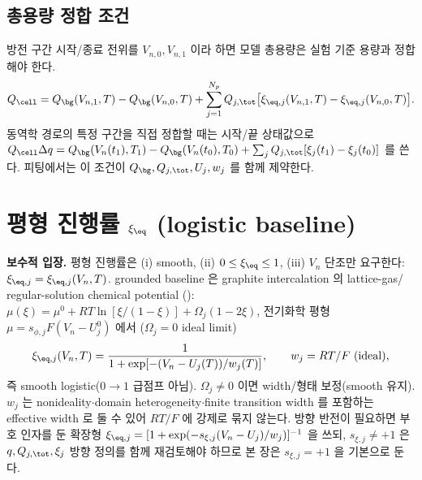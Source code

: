 \subsection{총용량 정합 조건}\label{sec:capmatch}
방전 구간 시작/종료 전위를 $V_{n,0},V_{n,1}$ 이라 하면 모델 총용량은 실험 기준 용량과 정합해야 한다.
\begin{equation}
Q_\cell=Q_\bg(V_{n,1},T)-Q_\bg(V_{n,0},T)+\sum_{j=1}^{N_p}Q_{j,\tot}\big[\xi_{\eq,j}(V_{n,1},T)-\xi_{\eq,j}(V_{n,0},T)\big].
\label{eq:capmatch}
\end{equation}
동역학 경로의 특정 구간을 직접 정합할 때는 시작/끝 상태값으로
$Q_\cell\Delta q=Q_\bg(V_n(t_1),T_1)-Q_\bg(V_n(t_0),T_0)+\sum_j Q_{j,\tot}[\xi_j(t_1)-\xi_j(t_0)]$ 를 쓴다.
피팅에서는 이 조건이 $Q_\bg,Q_{j,\tot},U_j,w_j$ 를 함께 제약한다.

\section{평형 진행률 $\xi_\eq$ (logistic baseline)}\label{sec:eq}
\textbf{보수적 입장.} 평형 진행률은 (i) smooth, (ii) $0\le\xi_\eq\le1$, (iii) $V_n$ 단조만 요구한다:
$\xi_{\eq,j}=\xi_{\eq,j}(V_n,T)$. grounded baseline 은 graphite intercalation 의 lattice-gas/
regular-solution chemical potential \cite{mckinnon1983,bazant2013}():
$\mu(\xi)=\mu^0+RT\ln[\xi/(1-\xi)]+\Omega_j(1-2\xi)$, 전기화학 평형 $\mu=s_{\phi,j}F(V_n-U_j^0)$ 에서
($\Omega_j=0$ ideal limit)
\begin{equation}
\xi_{\eq,j}(V_n,T)=\frac{1}{1+\exp[-(V_n-U_j(T))/w_j(T)]},\qquad w_j=RT/F\ (\text{ideal}),
\label{eq:logistic}
\end{equation}
즉 smooth logistic($0\!\to\!1$ 급점프 아님). $\Omega_j\ne0$ 이면 width/형태 보정(smooth 유지). $w_j$ 는
nonideality$\cdot$domain heterogeneity$\cdot$finite transition width 를 포함하는 effective width 로
둘 수 있어 $RT/F$ 에 강제로 묶지 않는다. 방향 반전이 필요하면 부호 인자를 둔 확장형
$\xi_{\eq,j}=[1+\exp(-s_{\xi,j}(V_n-U_j)/w_j)]^{-1}$ 을 쓰되, $s_{\xi,j}\ne+1$ 은 $q,Q_{j,\tot},\xi_j$
방향 정의를 함께 재검토해야 하므로 본 장은 $s_{\xi,j}=+1$ 을 기본으로 둔다.

